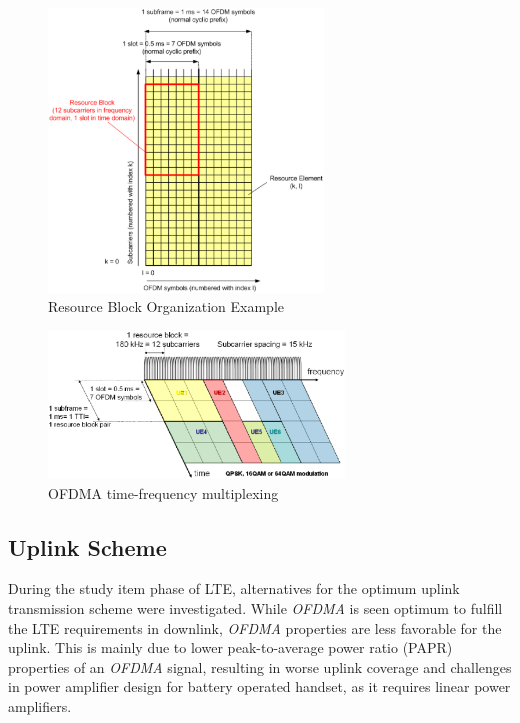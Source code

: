 \begin{figure}[htbp]
    \centering
    \includegraphics[width=0.65\textwidth]{./figures/ofdm_resource_block}
    \caption{ Resource Block Organization Example \cite{umtslte}
    \label{fig:ofdmresblk}}
\end{figure}


\begin{figure}[htbp]
    \centering
    \includegraphics[width=0.70\textwidth]{./figures/downlink_channels}
    \caption{ OFDMA time-frequency multiplexing
    \label{fig:dlchann}}
\end{figure}


\subsection{Uplink Scheme}%

 During the study item phase of LTE, alternatives for the optimum uplink
transmission scheme were investigated. While \textit{OFDMA} is seen optimum to fulfill
the LTE requirements in downlink, \textit{OFDMA} properties are less favorable for the
uplink. This is mainly due to lower peak-to-average power ratio (PAPR)
properties of an \textit{OFDMA} signal, resulting in worse uplink coverage and
challenges in power amplifier design for battery operated handset, as it
requires linear power amplifiers.

